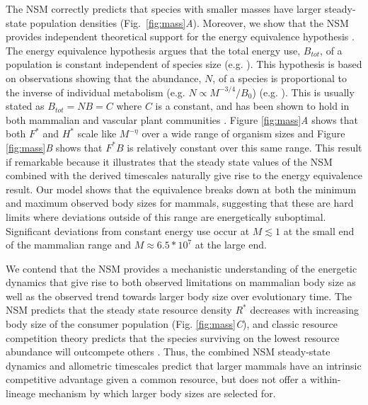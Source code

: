 \documentclass[11pt]{article}
\begin{document}
\begin{multicols}{2}
The NSM correctly predicts that species with smaller masses have larger steady-state population densities (Fig.~\ref{fig:mass}\emph{A}).
Moreover, we show that the NSM provides independent theoretical support for the energy equivalence hypothesis \cite{allen2002,enquist1998}.
The energy equivalence hypothesis argues that the total energy use, $B_{tot}$, of a population is constant independent of species size (e.g. \cite{allen2002,enquist1998}). %
This hypothesis is based on observations showing that the abundance, $N$, of a species is proportional to the inverse of individual metabolism (e.g. $N\propto M^{-3/4}/B_{0}$)  (e.g. \cite{allen2002,enquist1998}). 
This is usually stated as $B_{tot}=NB=C$ where $C$ is a constant, and has been shown to hold in both mammalian and vascular plant communities \cite{allen2002,enquist1998}. 
Figure \ref{fig:mass}\emph{A} shows that both $F^{*}$ and $H^{*}$ scale like $M^{-\eta}$ over a wide range of organism sizes and Figure \ref{fig:mass}\emph{B} shows that $F^{*}B$ is relatively constant over this same range. 
This result if remarkable because it illustrates that the steady state values of the NSM combined with the derived timescales naturally give rise to the energy equivalence result. 
Our model shows that the equivalence breaks down at both the minimum and maximum observed body sizes for mammals, suggesting that these are hard limits where deviations outside of this range are energetically suboptimal.  
Significant deviations from constant energy use occur at $M \lesssim 1$ at the small end of the mammalian range and $M\approx 6.5*10^7$ at the large end. 


We contend that the NSM provides a mechanistic understanding of the energetic dynamics that give rise to both observed limitations on mammalian body size as well as the observed trend towards larger body size over evolutionary time.
The NSM predicts that the steady state resource density $R^{*}$ decreases with increasing body size of the consumer population (Fig. \ref{fig:mass}\emph{C}), and classic resource competition theory predicts that the species surviving on the lowest resource abundance will outcompete others \cite{tilman1981,dutkiewicz2009,barton2010}. 
Thus, the combined NSM steady-state dynamics and allometric timescales predict that larger mammals have an intrinsic competitive advantage given a common resource, but does not offer a within-lineage mechanism by which larger body sizes are selected for.


\end{multicols}
\end{document}

